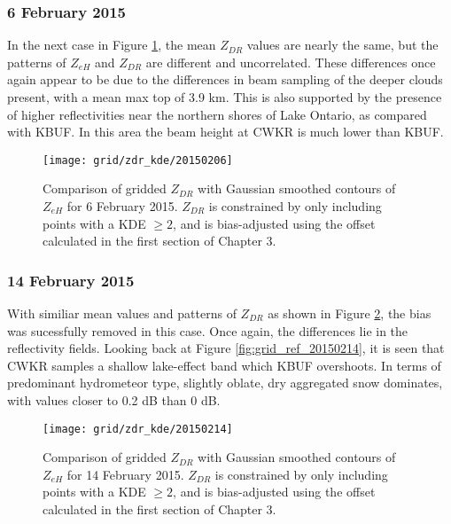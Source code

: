 \subsubsection{6 February 2015}
In the next case in Figure \ref{fig:grid_zdr_kde_20150206}, the mean $Z_{DR}$ values are nearly the same, but the patterns of $Z_{eH}$ and $Z_{DR}$ are different and uncorrelated. These differences once again appear to be due to the differences in beam sampling of the deeper clouds present, with a mean max top of 3.9 km. This is also supported by the presence of higher reflectivities near the northern shores of Lake Ontario, as compared with KBUF. In this area the beam height at CWKR is much lower than KBUF.
\begin{figure}[H]
\texttt{[image: grid/zdr\_kde/20150206]}
\caption{Comparison of gridded $Z_{DR}$ with Gaussian smoothed contours of $Z_{eH}$ for 6 February 2015. $Z_{DR}$ is constrained by only including points with a
KDE $\geq 2$, and is bias-adjusted using the offset calculated in the first section of Chapter 3.} 
\label{fig:grid_zdr_kde_20150206}
\end{figure}

\subsubsection{14 February 2015}
With similiar mean values and patterns of $Z_{DR}$ as shown in Figure \ref{fig:grid_zdr_kde_20150214}, the bias was sucessfully removed in this case. Once again, the differences lie in the reflectivity fields. Looking back at Figure \ref{fig:grid_ref_20150214}, it is seen that CWKR samples a shallow lake-effect band which KBUF overshoots. In terms of predominant hydrometeor type, slightly oblate, dry aggregated snow dominates, with values closer to 0.2 dB than 0 dB. 
\begin{figure}[H]
\texttt{[image: grid/zdr\_kde/20150214]}
\caption{Comparison of gridded $Z_{DR}$ with Gaussian smoothed contours of $Z_{eH}$ for 14 February 2015. $Z_{DR}$ is constrained by only including points with a
KDE $\geq 2$, and is bias-adjusted using the offset calculated in the first section of Chapter 3.} 
\label{fig:grid_zdr_kde_20150214}
\end{figure}

